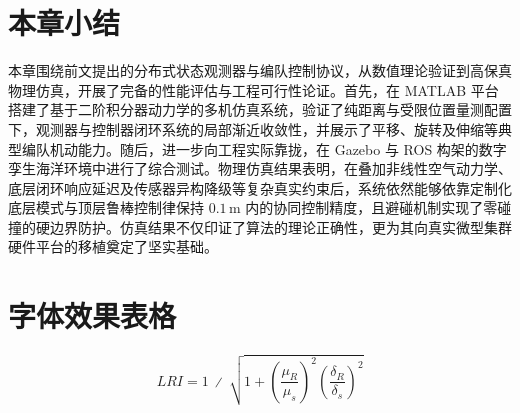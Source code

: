 \section{本章小结}
本章围绕前文提出的分布式状态观测器与编队控制协议，从数值理论验证到高保真物理仿真，开展了完备的性能评估与工程可行性论证。首先，在 MATLAB 平台搭建了基于二阶积分器动力学的多机仿真系统，验证了纯距离与受限位置量测配置下，观测器与控制器闭环系统的局部渐近收敛性，并展示了平移、旋转及伸缩等典型编队机动能力。随后，进一步向工程实际靠拢，在 Gazebo 与 ROS 构架的数字孪生海洋环境中进行了综合测试。物理仿真结果表明，在叠加非线性空气动力学、底层闭环响应延迟及传感器异构降级等复杂真实约束后，系统依然能够依靠定制化底层模式与顶层鲁棒控制律保持 $0.1\,\text{m}$ 内的协同控制精度，且避碰机制实现了零碰撞的硬边界防护。仿真结果不仅印证了算法的理论正确性，更为其向真实微型集群硬件平台的移植奠定了坚实基础。















\section{字体效果表格}

\begin{equation}
	LRI=1\ ∕\ \sqrt{1+{\left(\frac{{\mu }_{R}}{{\mu }_{s}}\right)}^{2}{\left(\frac{{\delta }_{R}}{{\delta }_{s}}\right)}^{2}}
\end{equation}


